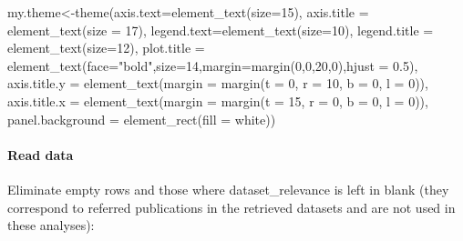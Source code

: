 \documentclass[
]{article}
\newenvironment{Shaded}{\begin{snugshade}}{\end{snugshade}}
\newcommand{\AttributeTok}[1]{\textcolor[rgb]{0.77,0.63,0.00}{#1}}
\newcommand{\ConstantTok}[1]{\textcolor[rgb]{0.00,0.00,0.00}{#1}}
\newcommand{\DecValTok}[1]{\textcolor[rgb]{0.00,0.00,0.81}{#1}}
\newcommand{\FloatTok}[1]{\textcolor[rgb]{0.00,0.00,0.81}{#1}}
\newcommand{\FunctionTok}[1]{\textcolor[rgb]{0.00,0.00,0.00}{#1}}
\newcommand{\NormalTok}[1]{#1}
\newcommand{\OtherTok}[1]{\textcolor[rgb]{0.56,0.35,0.01}{#1}}
\newcommand{\SpecialCharTok}[1]{\textcolor[rgb]{0.00,0.00,0.00}{#1}}
\newcommand{\StringTok}[1]{\textcolor[rgb]{0.31,0.60,0.02}{#1}}
\begin{document}
\begin{Shaded}
\begin{Highlighting}[]
\NormalTok{my.theme}\OtherTok{\textless{}{-}}\FunctionTok{theme}\NormalTok{(}\AttributeTok{axis.text=}\FunctionTok{element\_text}\NormalTok{(}\AttributeTok{size=}\DecValTok{15}\NormalTok{),}
        \AttributeTok{axis.title =} \FunctionTok{element\_text}\NormalTok{(}\AttributeTok{size =} \DecValTok{17}\NormalTok{),}
        \AttributeTok{legend.text=}\FunctionTok{element\_text}\NormalTok{(}\AttributeTok{size=}\DecValTok{10}\NormalTok{),}
        \AttributeTok{legend.title =} \FunctionTok{element\_text}\NormalTok{(}\AttributeTok{size=}\DecValTok{12}\NormalTok{),}
        \AttributeTok{plot.title =} \FunctionTok{element\_text}\NormalTok{(}\AttributeTok{face=}\StringTok{"bold"}\NormalTok{,}\AttributeTok{size=}\DecValTok{14}\NormalTok{,}\AttributeTok{margin=}\FunctionTok{margin}\NormalTok{(}\DecValTok{0}\NormalTok{,}\DecValTok{0}\NormalTok{,}\DecValTok{20}\NormalTok{,}\DecValTok{0}\NormalTok{),}\AttributeTok{hjust =} \FloatTok{0.5}\NormalTok{),}
        \AttributeTok{axis.title.y =} \FunctionTok{element\_text}\NormalTok{(}\AttributeTok{margin =} \FunctionTok{margin}\NormalTok{(}\AttributeTok{t =} \DecValTok{0}\NormalTok{, }\AttributeTok{r =} \DecValTok{10}\NormalTok{, }\AttributeTok{b =} \DecValTok{0}\NormalTok{, }\AttributeTok{l =} \DecValTok{0}\NormalTok{)),}
        \AttributeTok{axis.title.x =} \FunctionTok{element\_text}\NormalTok{(}\AttributeTok{margin =} \FunctionTok{margin}\NormalTok{(}\AttributeTok{t =} \DecValTok{15}\NormalTok{, }\AttributeTok{r =} \DecValTok{0}\NormalTok{, }\AttributeTok{b =} \DecValTok{0}\NormalTok{, }\AttributeTok{l =} \DecValTok{0}\NormalTok{)),}
        \AttributeTok{panel.background =} \FunctionTok{element\_rect}\NormalTok{(}\AttributeTok{fill =} \StringTok{\textquotesingle{}white\textquotesingle{}}\NormalTok{))}
\end{Highlighting}
\end{Shaded}

\hypertarget{read-data}{%
\paragraph{Read data}\label{read-data}}

Eliminate empty rows and those where dataset\_relevance is left in blank
(they correspond to referred publications in the retrieved datasets and
are not used in these analyses):

\begin{Shaded}
\end{Shaded}
\end{document}
